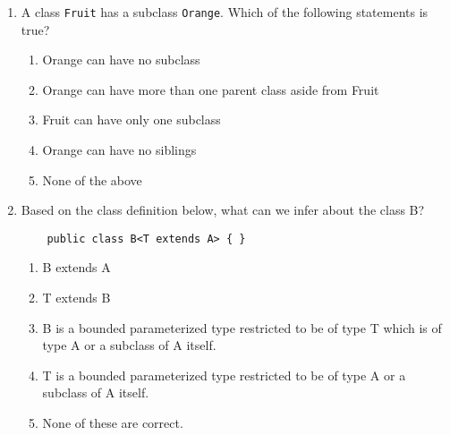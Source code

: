 \documentclass[S17-Final.tex]{subfiles}
\begin{document}
\begin{enumerate}
    
	
\clearpage
\item A class \texttt{Fruit} has a subclass \texttt{Orange}. Which of the following statements is true?
	
\begin{enumerate}
\item  Orange can have no subclass
\item  Orange can have more than one parent class aside from Fruit
\item  Fruit can have only one subclass
\item  Orange can have no siblings
\item  None of the above \ifdraft \Ans \fi 
\end{enumerate}

\item Based on the class definition below, what can we infer about the class B?
\begin{lstlisting}
    public class B<T extends A> { }
\end{lstlisting}
	
\begin{enumerate}
\item  B extends A
\item  T extends B
\item  B is a bounded parameterized type restricted to be of type T which is of type A or a subclass of A itself.
\item  T is a bounded parameterized type restricted to be of type A or a subclass of A itself.\ifdraft \Ans \fi 
\item  None of these are correct.
\end{enumerate}


\end{enumerate}
\end{document}
